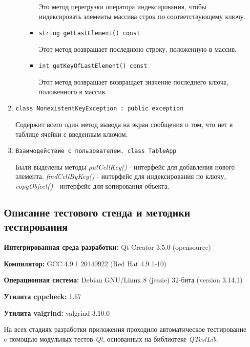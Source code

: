 \documentclass[12pt,a4paper]{report}
\begin{document}
\begin{enumerate}
\begin{itemize}
\begin{itemize}
Это метод перегрузки оператора индексирования, чтобы индексировать элементы массива строк по соответствующему ключу.
\item \verb+string getLastElement() const+

Этот метод возвращает последнюю строку, положенную в массив.
\item \verb+int getKeyOfLastElement() const+

Этот метод возвращает возвращает значение последнего ключа, положенного в массив.
\end{itemize}
\end{itemize}

\item \verb+class NonexistentKeyException : public exception+

Содержит всего один метод вывода на экран сообщения о том, что нет в таблице ячейки с введенным ключом.

\item \verb+Взаимодействие с пользователем. class TableApp+
\hspace{\parindent}

Были выделены методы \textit{putCellKey()} - интерфейс для добавления нового элемента, \textit{findCellByKey()} - интерфейс для индексирования по ключу, \textit{copyObject()} - интерфейс для копирования объекта.

\end{enumerate}
\subsection{Описание тестового стенда и методики тестирования}

\begin{flushleft}
\textbf{Интегрированная среда разработки:} Qt Creator 3.5.0 (opensource)

\textbf{Компилятор:} GCC 4.9.1 20140922 (Red Hat 4.9.1-10)

\textbf{Операционная система:} Debian GNU/Linux 8 (jessie) 32-бита (version 3.14.1)

\textbf{Утилита cppcheck:} 1.67

\textbf{Утилита valgrind:} valgrind-3.10.0
\end{flushleft}

На всех стадиях разработки приложения проходило автоматическое тестирование c помощью модульных тестов \textit{Qt}, основанных на библиотеке  \textit{QTestLib}.
\end{document}
